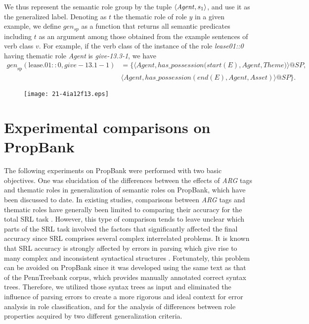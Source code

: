 \documentclass[english]{jnlp_1.4_rep}
\begin{document}
We thus represent the semantic role group by the tuple $\langle {\it
Agent},s_1\rangle$, and use it as the generalized label. Denoting as $t$ the thematic role of role $y$ in a given example, we define $gen_{sp}$ as a function that returns all semantic predicates including $t$ as an argument among those obtained from the example sentences of verb class $v$. For example, if the verb class of the instance of the role {\it lease01::0} having thematic role {\it Agent} is {\it give-13.3-1}, we have
\begin{align*}
\mathit{gen}_\mathrm{sp}(\mathrm{lease.01::0},\mathit{give-13.1-1}) & = \{ \langle \mathit{Agent}, \mathit{has\_possession(start(E)}, \mathit{Agent},
 \mathit{Theme})\rangle@\mathit{SP}, \\
& \langle \mathit{Agent}, \mathit{has\_possession}(\mathit{end}(E), \mathit{Agent}, \mathit{Asset})\rangle@\mathit{SP} \}.
\end{align*}

\begin{figure}[t]
\begin{center}
\texttt{[image: 21-4ia12f13.eps]}
\end{center}
\label{fig:agent-of-possessing-asset}
\end{figure}


\section{Experimental comparisons on PropBank}

The following experiments on PropBank were performed with two basic objectives. One was elucidation of the differences between the effects of {\it ARG} tags and thematic roles in generalization of semantic roles on PropBank, which have been discussed to date. In existing studies, comparisons between {\it ARG} tags and thematic roles have generally been limited to comparing their accuracy for the total SRL task \cite{loper2007clr,yi-loper-palmer:2007:main,zapirain-agirre-marquez:2008:ACLMain}. However, this type of comparison tends to leave unclear which parts of the SRL task involved the factors that significantly affected the final accuracy since SRL comprises several complex interrelated problems.
It is known that SRL accuracy is strongly affected by errors in parsing which give rise to many complex and inconsistent syntactical structures \cite{marquez2008srl}. Fortunately, this problem can be avoided on PropBank since it was developed using the same text as that of the PennTreebank corpus, which provides manually annotated correct syntax trees.
Therefore, we utilized those syntax trees as input and eliminated the influence of parsing errors to create a more rigorous and ideal context for error analysis in role classification, and for the analysis of differences between role properties acquired by two different generalization criteria.
\end{document}
